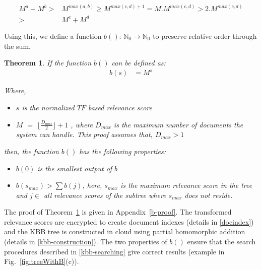 \documentclass[sigconf,pdftex]{acmart}
\newtheorem{theorem}{Theorem}[]
\begin{document}
\begin{equation*} 
\begin{split}
M^a + M^b >{}& M^{max(a, b)}
\geq M^{max(c, d) + 1} = M . M^{max(c, d)}
> 2 . M^{max(c, d)}\\
>{}& M^c + M^d
\end{split}
\end{equation*}

Using this, we define a function $b()$: $\mathbb{N}_0\xrightarrow{}\mathbb{N}_0$ to preserve relative order through the sum.

\begin{theorem}\label{b-theorem}
If the function $b()$ can be defined as:
 \begin{equation} 
\label{eq3_1}
\begin{split}
 b(s)  &= M^s
 \end{split}
\end{equation}

Where, 

\begin{itemize}
    \item[$-$] $s$ is the normalized $TF$ based relevance score
    
    \item[$-$] $M$ $=$ $\lfloor\frac{D_{max}}{2}\rfloor+1$ , where $D_{max}$ is the maximum number of documents the system can handle. This proof assumes that, $D_{max} > 1$
\end{itemize}


then, the function $b()$ has the following properties:
    \begin{itemize}
         \item[$-$] $b(0)$ is the smallest output of $b$
          \item[$-$] $b(s_{max}) > \sum b(j)$, here, $s_{max}$ is the maximum relevance score in the tree and $j \in$ all relevance scores of the subtree where $s_{max}$ does not reside.
    \end{itemize}

\end{theorem}

The proof of Theorem~\ref{b-theorem} is given in Appendix~\ref{b-proof}. The transformed relevance scores are encrypted to create document indexes (details in \ref{docindex}) and the KBB tree is constructed in cloud using partial homomorphic addition (details in  \ref{kbb-construction}). The two properties of $b()$ ensure that the search procedures described in \ref{kbb-searching} give correct results (example in Fig.~\ref{fig:treeWithB}(c)).
\end{document}
